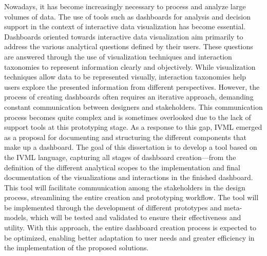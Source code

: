 
%

Nowadays, it has become increasingly necessary to process and analyze large volumes of data. The use of tools such as dashboards for analysis and decision support in the context of interactive data visualization has become essential. Dashboards oriented towards interactive data visualization aim primarily to address the various analytical questions defined by their users. These questions are answered through the use of visualization techniques and interaction taxonomies to represent information clearly and objectively. While visualization techniques allow data to be represented visually, interaction taxonomies help users explore the presented information from different perspectives. However, the process of creating dashboards often requires an iterative approach, demanding constant communication between designers and stakeholders. This communication process becomes quite complex and is sometimes overlooked due to the lack of support tools at this prototyping stage. As a response to this gap, \gls{IVML} emerged as a proposal for documenting and structuring the different components that make up a dashboard. The goal of this dissertation is to develop a tool based on the \gls{IVML} language, capturing all stages of dashboard creation—from the definition of the different analytical scopes to the implementation and final documentation of the visualizations and interactions in the finished dashboard. This tool will facilitate communication among the stakeholders in the design process, streamlining the entire creation and prototyping workflow. The tool will be implemented through the development of different prototypes and meta-models, which will be tested and validated to ensure their effectiveness and utility. With this approach, the entire dashboard creation process is expected to be optimized, enabling better adaptation to user needs and greater efficiency in the implementation of the proposed solutions.

